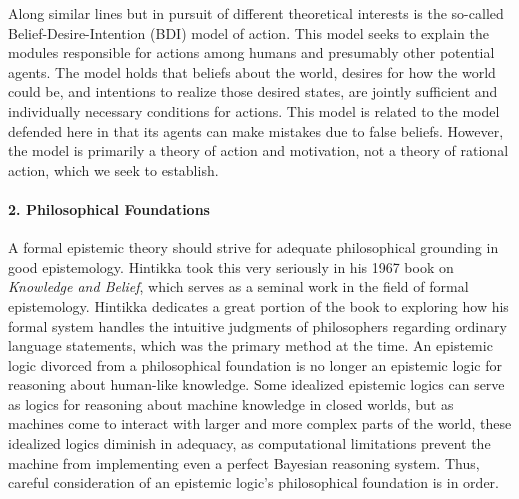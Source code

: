 
Along similar lines but in pursuit of different theoretical interests is the so-called Belief-Desire-Intention (BDI) model of action. This model seeks to explain the modules responsible for actions among humans and presumably other potential agents. The model holds that beliefs about the world, desires for how the world could be, and intentions to realize those desired states, are jointly sufficient and individually necessary conditions for actions. This model is related to the model defended here in that its agents can make mistakes due to false beliefs. However, the model is primarily a theory of action and motivation, not a theory of rational action, which we seek to establish.

\paragraph{2. Philosophical Foundations}
A formal epistemic theory should strive for adequate philosophical grounding in good epistemology. Hintikka took this very seriously in his 1967 book on \emph{Knowledge and Belief}\cite{Hintikka}, which serves as a seminal work in the field of formal epistemology. Hintikka dedicates a great portion of the book to exploring how his formal system handles the intuitive judgments of philosophers regarding ordinary language statements, which was the primary method at the time. An epistemic logic divorced from a philosophical foundation is no longer an epistemic logic for reasoning about human-like knowledge. Some idealized epistemic logics can serve as logics for reasoning about machine knowledge in closed worlds, but as machines come to interact with larger and more complex parts of the world, these idealized logics diminish in adequacy, as computational limitations prevent the machine from implementing even a perfect Bayesian reasoning system. Thus, careful consideration of an epistemic logic's philosophical foundation is in order.

